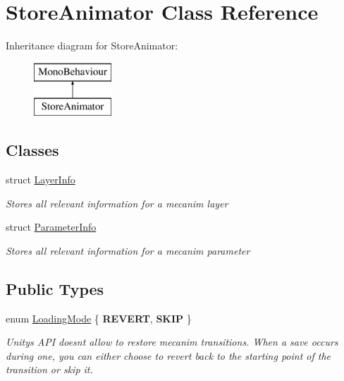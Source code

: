 \hypertarget{class_store_animator}{}\section{Store\+Animator Class Reference}
\label{class_store_animator}
Inheritance diagram for Store\+Animator\+:\begin{figure}[H]
\begin{center}
\leavevmode
\includegraphics[height=2.000000cm]{class_store_animator}
\end{center}
\end{figure}
\subsection*{Classes}
\begin{DoxyCompactItemize}
\item 
struct \hyperlink{struct_store_animator_1_1_layer_info}{Layer\+Info}
\begin{DoxyCompactList}\small\item\em Stores all relevant information for a mecanim layer \end{DoxyCompactList}\item 
struct \hyperlink{struct_store_animator_1_1_parameter_info}{Parameter\+Info}
\begin{DoxyCompactList}\small\item\em Stores all relevant information for a mecanim parameter \end{DoxyCompactList}\end{DoxyCompactItemize}
\subsection*{Public Types}
\begin{DoxyCompactItemize}
\item 
enum \hyperlink{class_store_animator_ab741d47aefde3f90b3d083632aac75e6}{Loading\+Mode} \{ {\bfseries R\+E\+V\+E\+RT}, 
{\bfseries S\+K\+IP}
 \}\begin{DoxyCompactList}\small\item\em Unity\textquotesingle{}s A\+PI doesn\textquotesingle{}t allow to restore mecanim transitions. When a save occurs during one, you can either choose to revert back to the starting point of the transition or skip it. \end{DoxyCompactList}
\end{DoxyCompactItemize}


